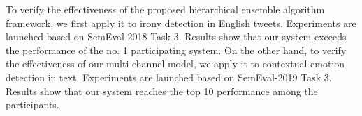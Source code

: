 \begin{eabstract}
\begin{enumerate}
\end{enumerate}

To verify the effectiveness of the proposed hierarchical ensemble algorithm framework, we first apply it to irony detection in English tweets. Experiments are launched based on SemEval-2018 Task 3. Results show that our system exceeds the performance of the no. 1 participating system. On the other hand, to verify the effectiveness of our multi-channel model, we apply it to contextual emotion detection in text. Experiments are launched based on SemEval-2019 Task 3. Results show that our system reaches the top 10 performance among the participants.

\end{eabstract}

